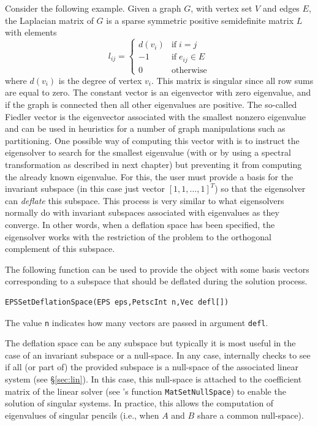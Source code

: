Consider the following example. Given a graph $G$, with vertex set $V$ and edges $E$, the Laplacian matrix of $G$ is a sparse symmetric positive semidefinite matrix $L$ with elements
$$l_{ij}=\left\{\begin{array}{cl}
         d(v_i) & \mathrm{if}\;i=j\\
         -1 & \mathrm{if}\;e_{ij}\in E\\
         0&\mathrm{otherwise}
\end{array}\right.$$
where $d(v_i)$ is the degree of vertex $v_i$. This matrix is singular since all row sums are equal to zero. The constant vector is an eigenvector with zero eigenvalue, and if the graph is connected then all other eigenvalues are positive. The so-called Fiedler vector is the eigenvector associated with the smallest nonzero eigenvalue and can be used in heuristics for a number of graph manipulations such as partitioning. One possible way of computing this vector with \slepc is to instruct the eigensolver to search for the smallest eigenvalue (with  or by using a spectral transformation as described in next chapter) but preventing it from computing the already known eigenvalue. For this, the user must provide a basis for the invariant subspace (in this case just vector $[1,1,\ldots,1]^T$) so that the eigensolver can \emph{deflate} this subspace. This process is very similar to what eigensolvers normally do with invariant subspaces associated with eigenvalues as they converge. In other words, when a deflation space has been specified, the eigensolver works with the restriction of the problem to the orthogonal complement of this subspace.

The following function can be used to provide the  object with some basis vectors corresponding to a subspace that should be deflated during the solution process.
        \begin{Verbatim}[fontsize=\small]
        EPSSetDeflationSpace(EPS eps,PetscInt n,Vec defl[])
        \end{Verbatim}
The value \texttt{n} indicates how many vectors are passed in argument \texttt{defl}.

The deflation space can be any subspace but typically it is most useful in the case of an invariant subspace or a null-space. In any case, \slepc internally checks to see if all (or part of) the provided subspace is a null-space of the associated linear system (see \S\ref{sec:lin}). In this case, this null-space is attached to the coefficient matrix of the linear solver (see \petsc's function \texttt{MatSetNullSpace}) to enable the solution of singular systems. In practice, this allows the computation of eigenvalues of singular pencils (i.e., when $A$ and $B$ share a common null-space).

